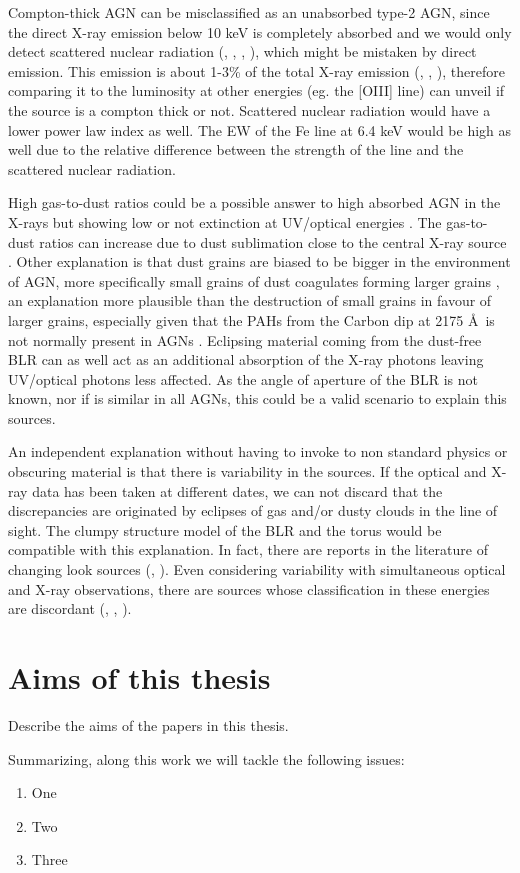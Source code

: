 Compton-thick AGN can be misclassified as an unabsorbed type-2 AGN, since the direct X-ray emission below 10 keV is completely absorbed and we would only detect scattered nuclear radiation (\citealt{braito03}, \citealt{akylas09}, \citealt{braito11}, \citealt{malizia12}), which might be mistaken by direct emission. This emission is about 1-3\% of the total X-ray emission (\citealt{gilli01}, \citealt{comastri04}, \citealt{georgantopoulos11a}), therefore comparing it to the luminosity at other energies (eg. the [OIII] line) can unveil if the source is a compton thick or not. Scattered nuclear radiation would have a lower power law index as well. The EW of the Fe line at 6.4 keV would be high as well due to the relative difference between the strength of the line and the scattered nuclear radiation.


High gas-to-dust ratios could be a possible answer to high absorbed AGN in the X-rays but showing low or not extinction at UV/optical energies . The gas-to-dust ratios can increase due to dust sublimation close to the central X-ray source \citep{granato97}. Other explanation is that dust grains are biased to be bigger in the environment of AGN, more specifically small grains of dust coagulates forming larger grains \citep{maiolino01}, an explanation more plausible than the destruction of small grains in favour of larger grains, especially given that the PAHs from the Carbon dip at 2175 \AA~is not normally present in AGNs \citep{hopkins04}. Eclipsing material coming from the dust-free BLR can as well act as an additional absorption of the X-ray photons leaving UV/optical photons less affected. As the angle of aperture of the BLR is not known, nor if is similar in all AGNs, this could be a valid scenario to explain this sources. 

An independent explanation without having to invoke to non standard physics or obscuring material is that there is variability in the sources. If the optical and X-ray data has been taken at different dates, we can not discard that the discrepancies are originated by eclipses of gas and/or dusty clouds in the line of sight. The clumpy structure model of the BLR and the torus would be compatible with this explanation.  In fact, there are reports in the literature of changing look sources (\citealt{lamassa15}, \citealt{miniutti14}). Even considering variability with simultaneous optical and X-ray observations, there are sources whose classification in these energies are discordant (\citealt{corral05}, \citealt{bianchi08}, \citeyear{bianchi12}).



\section{Aims of this thesis}
\label{sec1:aim}

Describe the aims of the papers in this thesis.

Summarizing, along this work we will tackle the following issues:

\begin{enumerate}
\item One

\item Two

\item Three

\end{enumerate}

